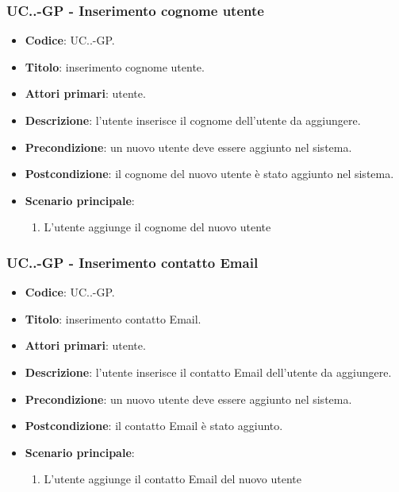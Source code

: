 		\subsubsection{UC\theuccount.\thesubuccount.\thesubsubuccount-GP - Inserimento cognome utente}

			\begin{itemize}
				\item \textbf{Codice}: UC\theuccount.\thesubuccount.\thesubsubuccount-GP.
				\item \textbf{Titolo}: inserimento cognome utente.
				\item \textbf{Attori primari}: utente.
				\item \textbf{Descrizione}: l'utente inserisce il cognome dell'utente da aggiungere.
				\item \textbf{Precondizione}: un nuovo utente deve essere aggiunto nel sistema.
				\item \textbf{Postcondizione}: il cognome del nuovo utente è stato aggiunto nel sistema.
				\item \textbf{Scenario principale}:
				\begin{enumerate}
					\item L'utente aggiunge il cognome del nuovo utente
				\end{enumerate}
			\end{itemize}

		\subsubsection{UC\theuccount.\thesubuccount.\thesubsubuccount-GP - Inserimento contatto Email}

			\begin{itemize}
				\item \textbf{Codice}: UC\theuccount.\thesubuccount.\thesubsubuccount-GP.
				\item \textbf{Titolo}: inserimento contatto Email.
				\item \textbf{Attori primari}: utente.
				\item \textbf{Descrizione}: l'utente inserisce il contatto Email dell'utente da aggiungere.
				\item \textbf{Precondizione}: un nuovo utente deve essere aggiunto nel sistema.
				\item \textbf{Postcondizione}: il contatto Email è stato aggiunto.
				\item \textbf{Scenario principale}:
				\begin{enumerate}
					\item L'utente aggiunge il contatto Email del nuovo utente
				\end{enumerate}
		\end{itemize}

